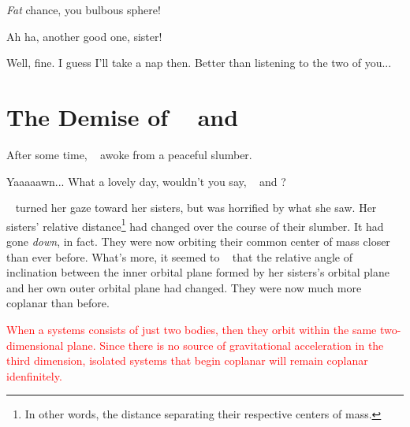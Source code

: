 \documentclass[main.tex]{subfiles}
\begin{document}
\par \Taygete \textit{Fat} chance, you bulbous sphere!

\par \Alcyone Ah ha, another good one, sister!

\par \Celaeno Well, fine.  I guess I'll take a nap then.  Better than listening to the two of you...

\section{The Demise of \rmtaygete~ and \rmalcyone}

\par \nar After some time, \rmcelaeno~ awoke from a peaceful slumber.  

\par \Celaeno Yaaaaawn... What a lovely day, wouldn't you say, \rmtaygete~ and \rmalcyone?

\par \nar \rmcelaeno~ turned her gaze toward her sisters, but was horrified by what she saw.  Her sisters' relative distance\footnote{In other words, the distance separating their respective centers of mass.} had changed over the course of their slumber.  It had gone \textit{down}, in fact.  They were now orbiting their common center of mass closer than ever before.  What's more, it seemed to \rmcelaeno~ that the relative angle of inclination between the inner orbital plane formed by her sisters's orbital plane and her own outer orbital plane had changed.  They were now much more coplanar than before.


\begin{tcolorbox}[sharp corners, colback=red!30, colframe=red!80!blue, title=Coplanar]
\par \textcolor{red}{When a systems consists of just two bodies, then they orbit within the same two-dimensional plane. Since there is no source of gravitational acceleration in the third dimension, isolated systems that begin coplanar will remain coplanar idenfinitely.}
\end{tcolorbox}
\end{document}
